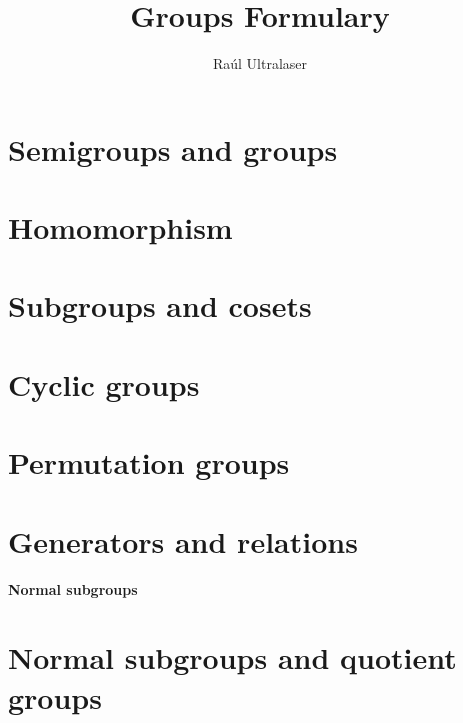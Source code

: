 \documentclass[twocolumn]{article}
\title{Groups Formulary}
\author{Raúl Ultralaser}
\date{}
\begin{document}
\maketitle
\section{Semigroups and groups}


\section{Homomorphism}
\setcounter{defi}{0}
\setcounter{teo}{0}
\setcounter{coro}{0}


\section{Subgroups and cosets}
\setcounter{defi}{0}
\setcounter{teo}{0}
\setcounter{coro}{0}


\section{Cyclic groups}
\setcounter{defi}{0}
\setcounter{teo}{0}
\setcounter{coro}{0}


\section{Permutation groups}
\setcounter{defi}{0}
\setcounter{teo}{0}
\setcounter{coro}{0}


\section{Generators and relations}\setcounter{defi}{0}
\setcounter{teo}{0}
\setcounter{coro}{0}


\newpage
\textbf{\huge Normal subgroups}
\section{Normal subgroups and quotient groups}
\setcounter{defi}{0}
\setcounter{teo}{0}
\setcounter{coro}{0}

\end{document}

